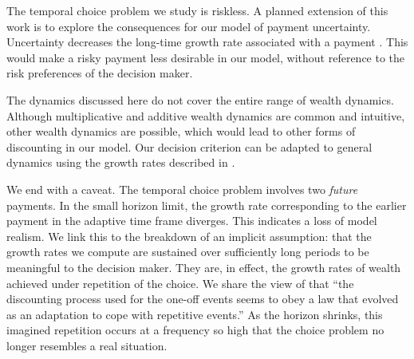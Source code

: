 The temporal choice problem we study is riskless. A planned extension of this work is to explore the consequences for our model of payment uncertainty. Uncertainty decreases the long-time growth rate associated with a payment \citep{PetersGell-Mann2016}. This would make a risky payment less desirable in our model, without reference to the risk preferences of the decision maker.

The dynamics discussed here do not cover the entire range of wealth dynamics. Although multiplicative and additive wealth dynamics are common and intuitive, other wealth dynamics are possible, which would lead to other forms of discounting in our model. Our decision criterion can be adapted to general dynamics using the growth rates described in \citep{PetersAdamou2018a}. 



We end with a caveat. The temporal choice problem involves two {\it future} payments. In the small horizon limit, the growth rate corresponding to the earlier payment in the adaptive time frame diverges. This indicates a loss of model realism. We link this to the breakdown of an implicit assumption: that the growth rates we compute are sustained over sufficiently long periods to be meaningful to the decision maker. They are, in effect, the growth rates of wealth achieved under repetition of the choice. We share the view of \citet[p.~60]{Kacelnik1997} that ``the discounting process used for the one-off events seems to obey a law that evolved as an adaptation to cope with repetitive events.'' As the horizon shrinks, this imagined repetition occurs at a frequency so high that the choice problem no longer resembles a real situation.


